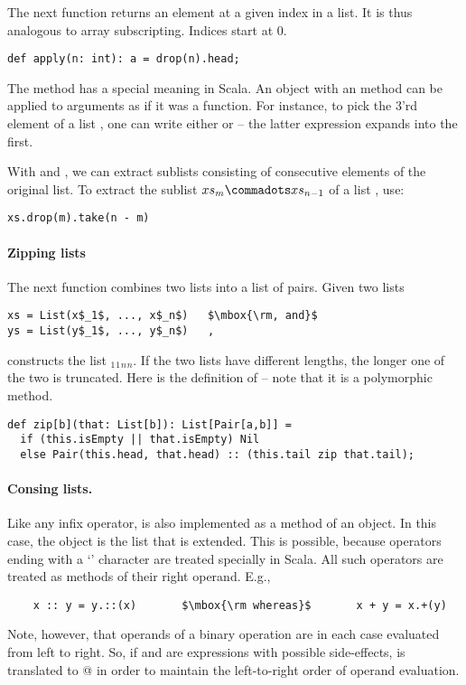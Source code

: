 \documentclass[a4paper,12pt,twoside,titlepage]{book}
\begin{document}
The next function returns an element at a given index in a list.
It is thus analogous to array subscripting. Indices start at 0.
\begin{lstlisting}   
def apply(n: int): a = drop(n).head;
\end{lstlisting}
The  method has a special meaning in Scala. An object with
an  method can be applied to arguments as if it was a
function. For instance, to pick the 3'rd element of a list ,
one can write either  or  -- the latter
expression expands into the first.

With  and , we can extract sublists consisting
of consecutive elements of the original list.  To extract the sublist
$xs_m \commadots xs_{n-1}$ of a list , use:

\begin{lstlisting}
xs.drop(m).take(n - m)
\end{lstlisting}

\paragraph{Zipping lists} The next function combines two lists into a list of pairs.
Given two lists
\begin{lstlisting}
xs = List(x$_1$, ..., x$_n$)   $\mbox{\rm, and}$
ys = List(y$_1$, ..., y$_n$)   ,
\end{lstlisting}
 constructs the list
$_1$$_1$$_n$$_n$\code{))}.
If the two lists have different lengths, the longer one of the two is
truncated. Here is the definition of  -- note that it is a
polymorphic method.
\begin{lstlisting}
def zip[b](that: List[b]): List[Pair[a,b]] = 
  if (this.isEmpty || that.isEmpty) Nil
  else Pair(this.head, that.head) :: (this.tail zip that.tail);
\end{lstlisting}

\paragraph{Consing lists.}
Like any infix operator, \code{::}
is also implemented as a method of an object. In this case, the object
is the list that is extended. This is possible, because operators
ending with a `\code{:}' character are treated specially in Scala.  
All such operators are treated as methods of their right operand. E.g.,
\begin{lstlisting}
    x :: y = y.::(x)       $\mbox{\rm whereas}$       x + y = x.+(y)                  
\end{lstlisting}
Note, however, that operands of a binary operation are in each case
evaluated from left to right.  So, if  and  are
expressions with possible side-effects,  is translated to
@ in order to maintain the left-to-right
order of operand evaluation.
\end{document}
